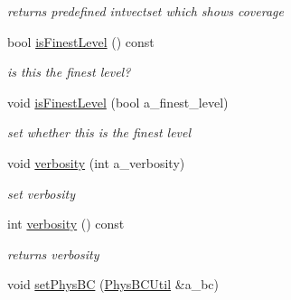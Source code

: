 \begin{DoxyCompactItemize}
\begin{DoxyCompactList}\small\item\em returns predefined intvectset which shows coverage \end{DoxyCompactList}\item 
\hypertarget{class_c_c_projector_comp_ae057986e10b0b53a40e3d37d7ca63431}{bool \hyperlink{class_c_c_projector_comp_ae057986e10b0b53a40e3d37d7ca63431}{is\-Finest\-Level} () const }\label{class_c_c_projector_comp_ae057986e10b0b53a40e3d37d7ca63431}

\begin{DoxyCompactList}\small\item\em is this the finest level? \end{DoxyCompactList}\item 
\hypertarget{class_c_c_projector_comp_a1486e4104ad26d2396ce0829400d37ee}{void \hyperlink{class_c_c_projector_comp_a1486e4104ad26d2396ce0829400d37ee}{is\-Finest\-Level} (bool a\-\_\-finest\-\_\-level)}\label{class_c_c_projector_comp_a1486e4104ad26d2396ce0829400d37ee}

\begin{DoxyCompactList}\small\item\em set whether this is the finest level \end{DoxyCompactList}\item 
\hypertarget{class_c_c_projector_comp_a1422f982543e2e3b9d533b643b29bf5a}{void \hyperlink{class_c_c_projector_comp_a1422f982543e2e3b9d533b643b29bf5a}{verbosity} (int a\-\_\-verbosity)}\label{class_c_c_projector_comp_a1422f982543e2e3b9d533b643b29bf5a}

\begin{DoxyCompactList}\small\item\em set verbosity \end{DoxyCompactList}\item 
\hypertarget{class_c_c_projector_comp_aadfae6580dcd40f7fa713b885d78be25}{int \hyperlink{class_c_c_projector_comp_aadfae6580dcd40f7fa713b885d78be25}{verbosity} () const }\label{class_c_c_projector_comp_aadfae6580dcd40f7fa713b885d78be25}

\begin{DoxyCompactList}\small\item\em returns verbosity \end{DoxyCompactList}\item 
\hypertarget{class_c_c_projector_comp_a89c678131dc37018fe25476cc487ba11}{void \hyperlink{class_c_c_projector_comp_a89c678131dc37018fe25476cc487ba11}{set\-Phys\-B\-C} (\hyperlink{class_phys_b_c_util}{Phys\-B\-C\-Util} \&a\-\_\-bc)}\label{class_c_c_projector_comp_a89c678131dc37018fe25476cc487ba11}


\end{DoxyCompactItemize}
